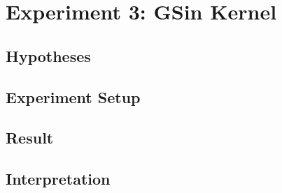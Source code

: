 \documentclass[./\jobname.tex]{subfiles}
\begin{document}
\chapter {Experiment 3: GSin Kernel}
\label{chap:experimet_3}

\section{Hypotheses}

\section{Experiment Setup}

\section{Result}

\section{Interpretation}
\end{document}
